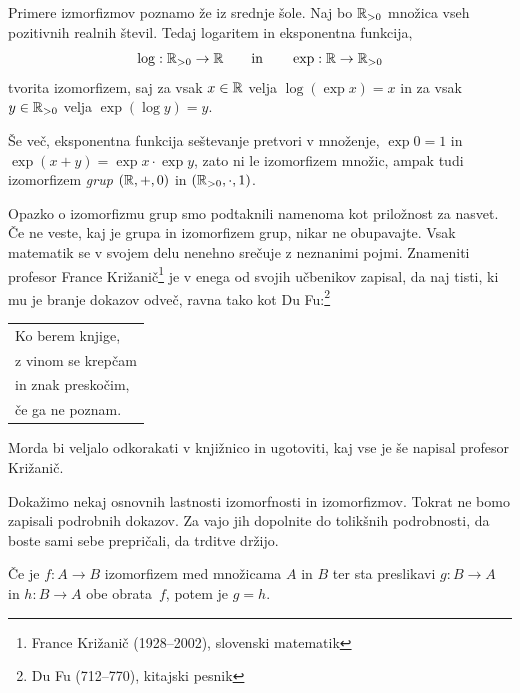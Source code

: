 \begin{zgled}\label{zgled:logaritmiranje-je-obratno-od-eksponenciranja}
  Primere izmorfizmov poznamo že iz srednje šole. Naj bo $\mathbb{R}_{>0}$ množica vseh pozitivnih realnih
  števil. Tedaj logaritem in eksponentna funkcija,
  \begin{equation*}
    \log : \mathbb{R}_{>0} \to \mathbb{R}
    \qquad\text{in}\qquad
    \exp : \mathbb{R} \to \mathbb{R}_{>0}
  \end{equation*}
  tvorita izomorfizem, saj za vsak $x \in \mathbb{R}$ velja $\log (\exp x) = x$ in za vsak $y \in \mathbb{R}_{>0}$
  velja $\exp (\log y) = y$.

  Še več, eksponentna funkcija seštevanje pretvori v množenje,
  $\exp 0 = 1$ in $\exp (x + y) = \exp x \cdot \exp y$, zato ni le izomorfizem množic, ampak tudi izomorfizem \emph{grup} $(\mathbb{R}, {+}, 0)$ in $(\mathbb{R}_{>0}, {\cdot}, 1)$.

  Opazko o izomorfizmu grup smo podtaknili namenoma kot priložnost za nasvet.
  Če ne veste, kaj je grupa in izomorfizem grup, nikar ne obupavajte. Vsak matematik se v
  svojem delu nenehno srečuje z neznanimi pojmi. Znameniti profesor
  France Križanič\footnote{France Križanič (1928--2002), slovenski matematik} je v enega od
  svojih učbenikov zapisal, da naj tisti, ki mu je branje dokazov odveč, ravna tako kot Du
  Fu:\footnote{Du Fu (712--770), kitajski pesnik}
  \begin{center}
    \begin{tabular}{l}
      Ko berem knjige,\\
      z vinom se krepčam\\
      in znak preskočim,\\
      če ga ne poznam.
    \end{tabular}
  \end{center}
  Morda  bi veljalo odkorakati v knjižnico in ugotoviti, kaj vse je še napisal profesor Križanič.
\end{zgled}


Dokažimo nekaj osnovnih lastnosti izomorfnosti in izomorfizmov. Tokrat ne bomo zapisali
podrobnih dokazov. Za vajo jih dopolnite do tolikšnih podrobnosti, da boste sami sebe
prepričali, da trditve držijo.

\begin{trditev}
  \label{trditev:enolicen-inverz}%
  Če je $f : A \to B$ izomorfizem med množicama $A$ in $B$ ter sta preslikavi
  $g : B \to A$ in $h : B \to A$ obe obrata~$f$, potem je $g = h$.
\end{trditev}

